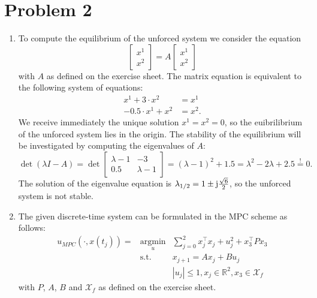\documentclass[12pt,pdftex,a4paper]{scrartcl}
\DeclareMathOperator*{\argmin}{argmin}
\begin{document}
\section*{Problem 2}
\begin{enumerate}
    \item To compute the equilibrium of the unforced system we consider the equation
    \begin{equation*}
         \begin{bmatrix}
             x^1 \\ x^2
         \end{bmatrix}
         = A
         \begin{bmatrix}
             x^1 \\ x^2
         \end{bmatrix}
    \end{equation*}
    with $A$ as defined on the exercise sheet. The matrix equation is equivalent to the following system of equations:
    \begin{align*}
         x^1 + 3 \cdot x^2 &= x^1 \\
         -0.5 \cdot x^1 +x^2 &= x^2.
    \end{align*}
    We receive immediately the unique solution $x^1 = x^2 = 0$, so the euibrilibrium of the unforced system lies in the origin. The stability of the equilibrium will be investigated by computing the eigenvalues of $A$:
    \begin{equation*}         
         \det (\lambda I - A) = \det
         \begin{bmatrix}
            \lambda -1 & -3 \\
            0.5 & \lambda -1
         \end{bmatrix}
         = (\lambda -1)^2 +1.5 = \lambda^2 -2 \lambda +2.5 \overset{!}{=} 0.
    \end{equation*}
    The solution of the eigenvalue equation is $\lambda_{1/2} = 1 \pm \im \frac{\sqrt{6}}{2}$, so the unforced system is not stable.
    
    \item The given discrete-time system can be formulated in the MPC scheme as follows:
    \begin{equation} 
    \begin{array}{rcl} 
    u_{MPC} (\cdot , x(t_j)) = &\argmin\limits_u& \sum\limits_{j=0}^2 x_j^\top x_j + u_j^2 +x_3^\top P x_3 \\ 
    &\mathrm{s.t.}& x_{j+1} = A x_j + B u_j \\ 
    && |u_j| \leq 1, x_j \in \mathbb{R}^2, x_3 \in \mathcal{X}_f%
    \end{array}      
    \end{equation}
    with $P$, $A$, $B$ and $\mathcal{X}_f$ as defined on the exercise sheet.
    

\end{enumerate}
\end{document}
